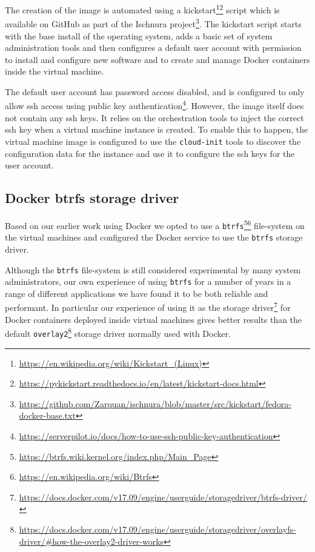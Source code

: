 \documentclass{article}
\newcommand{\docker} {Docker\xspace}
\newcommand{\ischnura} {Ischnura\xspace}
\newcommand{\cloudinit} {\texttt{cloud-init}\xspace}
\newcommand{\kickstart} {kickstart\xspace}
\newcommand{\btrfs} {\texttt{btrfs}\xspace}
\newcommand{\filesystem} {file-system\xspace}
\newcommand{\github} {GitHub\xspace}
\newcommand{\footurl}[1] {\footnote{\url{#1}}}
\begin{document}
The creation of the image is automated using a \kickstart\footurl{https://en.wikipedia.org/wiki/Kickstart_(Linux)}\footurl{https://pykickstart.readthedocs.io/en/latest/kickstart-docs.html} script which is available on \github as part of the \ischnura project\footurl{https://github.com/Zarquan/ischnura/blob/master/src/kickstart/fedora-docker-base.txt}. The kickstart script starts with the base install of the operating system, adds a basic set of system administration tools and then configures a default user account with permission to install and configure new software and to create and manage \docker containers inside the virtual machine.

The default user account has password access disabled, and is configured to only allow ssh access using public key authentication\footurl{https://serverpilot.io/docs/how-to-use-ssh-public-key-authentication}. However, the image itself does not contain any ssh keys. It relies on the orchestration tools to inject the correct ssh key when a virtual machine instance is created.
To enable this to happen, the virtual machine image is configured to use the \cloudinit tools to discover the configuration data for the instance and use it to configure the ssh keys for the user account.

\subsection{\docker btrfs storage driver}
\label{docker.btrfs.}

Based on our earlier work using \docker\cite{Morris-2017} we opted to use a \btrfs\footurl{https://btrfs.wiki.kernel.org/index.php/Main_Page}\footurl{https://en.wikipedia.org/wiki/Btrfs} \filesystem on the virtual machines and configured the \docker service to use the \btrfs storage driver. 

Although the \btrfs \filesystem is still considered experimental by many system administrators, our own experience of using \btrfs for a number of years in a range of different applications we have found it to be both reliable and performant. In particular our experience of using it as the storage driver\footurl{https://docs.docker.com/v17.09/engine/userguide/storagedriver/btrfs-driver/} for \docker containers deployed inside virtual machines gives better results than the default \texttt{overlay2}\footurl{https://docs.docker.com/v17.09/engine/userguide/storagedriver/overlayfs-driver/#how-the-overlay2-driver-works} storage driver normally used with \docker.
\end{document}
